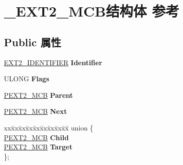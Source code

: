 \hypertarget{struct___e_x_t2___m_c_b}{}\section{\+\_\+\+E\+X\+T2\+\_\+\+M\+C\+B结构体 参考}
\label{struct___e_x_t2___m_c_b}
\subsection*{Public 属性}
\begin{DoxyCompactItemize}
\item 
\mbox{\label{struct___e_x_t2___m_c_b_af0832e23128bd08cea2a2b8f09d23c75}} 
\hyperlink{struct___e_x_t2___i_d_e_n_t_i_f_i_e_r}{E\+X\+T2\+\_\+\+I\+D\+E\+N\+T\+I\+F\+I\+ER} {\bfseries Identifier}
\item 
\mbox{\label{struct___e_x_t2___m_c_b_aba29115d1a6b75e229d13795c1889dfb}} 
U\+L\+O\+NG {\bfseries Flags}
\item 
\mbox{\label{struct___e_x_t2___m_c_b_a41cd45fd22e760f3be857a07fedcfeb0}} 
\hyperlink{struct___e_x_t2___m_c_b}{P\+E\+X\+T2\+\_\+\+M\+CB} {\bfseries Parent}
\item 
\mbox{\label{struct___e_x_t2___m_c_b_ac4e6ebeea015427cf7898e8fe1b75091}} 
\hyperlink{struct___e_x_t2___m_c_b}{P\+E\+X\+T2\+\_\+\+M\+CB} {\bfseries Next}
\item 
\mbox{\label{struct___e_x_t2___m_c_b_aafd63acc630328044207d6d16c419908}} 
\begin{tabbing}
xx\=xx\=xx\=xx\=xx\=xx\=xx\=xx\=xx\=\kill
union \{\\
\>\hyperlink{struct___e_x_t2___m_c_b}{PEXT2\_MCB} {\bfseries Child}\\
\>\hyperlink{struct___e_x_t2___m_c_b}{PEXT2\_MCB} {\bfseries Target}\\
\}; \\


\end{tabbing}
\end{DoxyCompactItemize}
